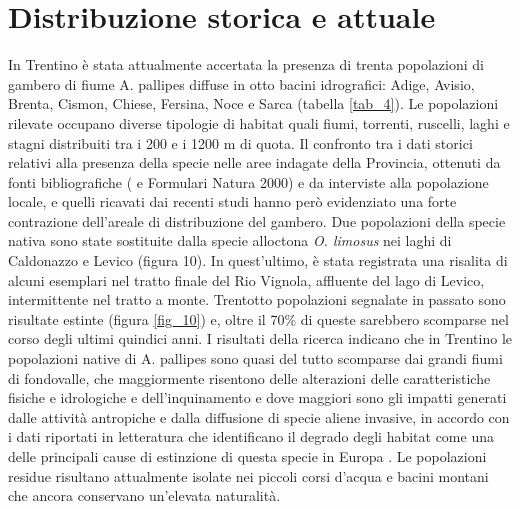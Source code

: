 \documentclass[11pt,a4paper,italian,twoside,openany]{memoir}
\begin{document}
\section{Distribuzione storica e attuale} 
In Trentino è stata attualmente accertata la presenza di trenta popolazioni di gambero di fiume A. pallipes diffuse in otto bacini idrografici: Adige, Avisio, Brenta, Cismon, Chiese, Fersina, Noce e Sarca (tabella \ref{tab_4}). 
Le popolazioni rilevate occupano diverse tipologie di habitat quali fiumi, torrenti, ruscelli, laghi e stagni distribuiti tra i 200 e i 1200 m di quota. Il confronto tra i dati storici relativi alla presenza della specie nelle aree indagate della Provincia, ottenuti da fonti bibliografiche (\cite{Albrecht 1982} \cite{Pagotto 1995} \cite{Fratini 2005} \cite{Paoli 2008} e Formulari Natura 2000) e da interviste alla popolazione locale, e quelli ricavati dai recenti studi hanno però evidenziato una forte contrazione dell'areale di distribuzione del gambero. Due popolazioni della specie nativa sono state sostituite dalla specie alloctona \emph{O. limosus} nei laghi di Caldonazzo e Levico (figura 10). In quest'ultimo, è stata registrata una risalita di alcuni esemplari nel tratto finale del Rio Vignola, affluente del lago di Levico, intermittente nel tratto a monte. Trentotto popolazioni segnalate in passato sono risultate estinte (figura \ref{fig_10}) e, oltre il 70\% di queste sarebbero scomparse nel corso degli ultimi quindici anni. I risultati della ricerca indicano che in Trentino le popolazioni native di A. pallipes sono quasi del tutto scomparse dai grandi fiumi di fondovalle, che maggiormente risentono delle alterazioni delle caratteristiche fisiche e idrologiche e dell'inquinamento e dove maggiori sono gli impatti generati dalle attività antropiche e dalla diffusione di specie aliene invasive, in accordo con i dati riportati in letteratura che identificano il degrado degli habitat come una delle principali cause di estinzione di questa specie in Europa \cite{Fureder 2003b} \cite{Renai 2006} \cite{Sint 2007} \cite{Trouilhe 2007} \cite{Brusconi 2008} \cite{Aquiloni 2010}. Le popolazioni residue risultano attualmente isolate nei piccoli corsi d'acqua e bacini montani che ancora conservano un'elevata naturalità.
\end{document}
